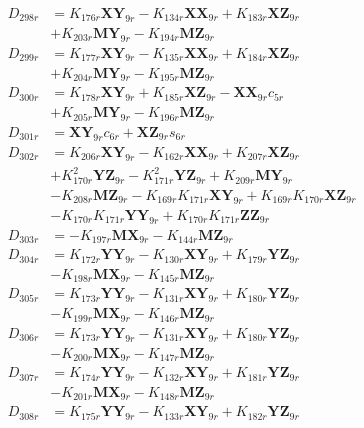 \begin{align}
D_{298r} &= K_{176r}\mathbf{XY}_{9r} - K_{134r}\mathbf{XX}_{9r} + K_{183r}\mathbf{XZ}_{9r}  \nonumber \\
&+ K_{203r}\mathbf{MY}_{9r} - K_{194r}\mathbf{MZ}_{9r} \nonumber \\
D_{299r} &= K_{177r}\mathbf{XY}_{9r} - K_{135r}\mathbf{XX}_{9r} + K_{184r}\mathbf{XZ}_{9r}  \nonumber \\
&+ K_{204r}\mathbf{MY}_{9r} - K_{195r}\mathbf{MZ}_{9r} \nonumber \\
D_{300r} &= K_{178r}\mathbf{XY}_{9r} + K_{185r}\mathbf{XZ}_{9r} - \mathbf{XX}_{9r}c_{5r}  \nonumber \\
&+ K_{205r}\mathbf{MY}_{9r} - K_{196r}\mathbf{MZ}_{9r} \nonumber \\
D_{301r} &= \mathbf{XY}_{9r}c_{6r} + \mathbf{XZ}_{9r}s_{6r} \nonumber \\
D_{302r} &= K_{206r}\mathbf{XY}_{9r} - K_{162r}\mathbf{XX}_{9r} + K_{207r}\mathbf{XZ}_{9r}  \nonumber \\
&+ K_{170r}^2\mathbf{YZ}_{9r} - K_{171r}^2\mathbf{YZ}_{9r} + K_{209r}\mathbf{MY}_{9r}  \nonumber \\
&- K_{208r}\mathbf{MZ}_{9r} - K_{169r}K_{171r}\mathbf{XY}_{9r} + K_{169r}K_{170r}\mathbf{XZ}_{9r}  \nonumber \\
&- K_{170r}K_{171r}\mathbf{YY}_{9r} + K_{170r}K_{171r}\mathbf{ZZ}_{9r} \nonumber \\
D_{303r} &= - K_{197r}\mathbf{MX}_{9r} - K_{144r}\mathbf{MZ}_{9r} \nonumber \\
D_{304r} &= K_{172r}\mathbf{YY}_{9r} - K_{130r}\mathbf{XY}_{9r} + K_{179r}\mathbf{YZ}_{9r}  \nonumber \\
&- K_{198r}\mathbf{MX}_{9r} - K_{145r}\mathbf{MZ}_{9r} \nonumber \\
D_{305r} &= K_{173r}\mathbf{YY}_{9r} - K_{131r}\mathbf{XY}_{9r} + K_{180r}\mathbf{YZ}_{9r}  \nonumber \\
&- K_{199r}\mathbf{MX}_{9r} - K_{146r}\mathbf{MZ}_{9r} \nonumber \\
D_{306r} &= K_{173r}\mathbf{YY}_{9r} - K_{131r}\mathbf{XY}_{9r} + K_{180r}\mathbf{YZ}_{9r}  \nonumber \\
&- K_{200r}\mathbf{MX}_{9r} - K_{147r}\mathbf{MZ}_{9r} \nonumber \\
D_{307r} &= K_{174r}\mathbf{YY}_{9r} - K_{132r}\mathbf{XY}_{9r} + K_{181r}\mathbf{YZ}_{9r}  \nonumber \\
&- K_{201r}\mathbf{MX}_{9r} - K_{148r}\mathbf{MZ}_{9r} \nonumber \\
D_{308r} &= K_{175r}\mathbf{YY}_{9r} - K_{133r}\mathbf{XY}_{9r} + K_{182r}\mathbf{YZ}_{9r}  \nonumber \\

\end{align}

